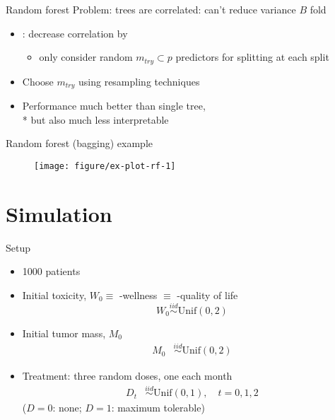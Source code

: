 \documentclass{beamer}
\begin{document}
\begin{frame}{Random forest}
  Problem: trees are correlated: can't reduce variance $B$ fold
  \begin{itemize}[<+->]
    \item \textcite{rf}: decrease correlation by 
    \begin{itemize}
      \item only consider random $m_{try} \subset p$ predictors for splitting at each split
    \end{itemize}
    \item Choose $m_{try}$ using resampling techniques
    \item Performance much better than single tree, \\* but also much less interpretable
  \end{itemize}
\end{frame}

\begin{frame}{Random forest (bagging) example}
  
  \begin{figure}[!htb]
  \begin{center}
    \texttt{[image: figure/ex-plot-rf-1]}
  \end{center}
  \end{figure}
  
\end{frame}



\section{Simulation} %
\label{sec:simulation}

\begin{frame}[c]{Setup}
  \begin{itemize}[<+->]
    \item 1000 patients
    
  \item Initial toxicity, $W_{0} \equiv$ -wellness $\equiv$ -quality of life
  \begin{equation*}
    W_{0} \overset{iid}{\sim} \text{Unif}(0, 2)
  \end{equation*}
  
  \item Initial tumor mass, $M_{0}$
  \begin{align*}
    M_{0} &\overset{iid}{\sim} \text{Unif}(0, 2)
  \end{align*}
  
  \item Treatment: three random doses, one each month
  \begin{align*}
    D_{t} &\overset{iid}{\sim} \text{Unif}(0, 1), \quad t = 0, 1, 2
  \end{align*}
  ($D = 0$: none; $D = 1$: maximum tolerable)
  \end{itemize}
\end{frame}
\end{document}
